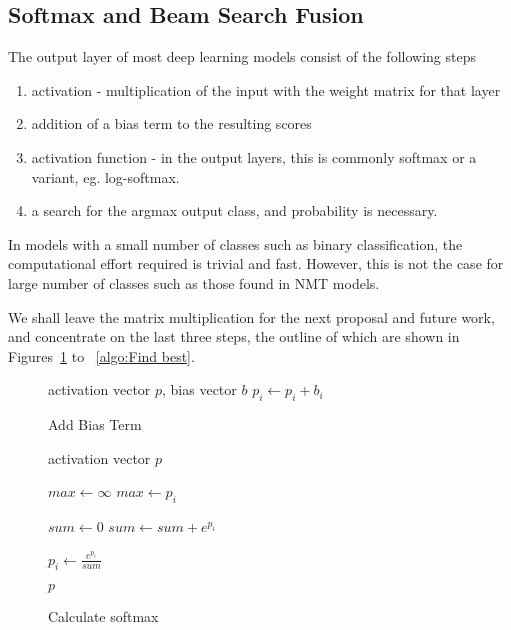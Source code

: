 \documentclass[]{article}
\begin{document}
\subsection{Softmax and Beam Search Fusion}

The output layer of most deep learning models consist of the following steps
\begin{enumerate}
   \item \vspace{-2 mm} activation - multiplication of the input with the weight matrix for that layer
   \item \vspace{-2 mm} addition of a bias term to the resulting scores
   \item \vspace{-2 mm} activation function - in the output layers, this is commonly softmax or a variant, eg. log-softmax.
   \item \vspace{-2 mm} a search for the argmax output class, and probability is necessary.
\end{enumerate}

In models with a small number of classes such as binary classification, the computational effort required is trivial and fast. However, this is not the case for large number of classes such as those found in NMT models.

We shall leave the matrix multiplication for the next proposal and future work, and concentrate on the last three steps, the outline of which are shown in Figures~\ref{algo:Add Bias Term} to ~\ref{algo:Find best}.

\begin{figure} [h]
\begin{algorithmic}
\REQUIRE activation vector $p$, bias vector $b$
  \STATE $p_i \gets p_i + b_i$
\ENDFOR 
\end{algorithmic}
\caption{Add Bias Term}
\label{algo:Add Bias Term}
\end{figure}

\begin{figure} [h]
\begin{algorithmic}
\REQUIRE activation vector $p$


\STATE $max \gets \infty$ 
    \STATE $max \gets p_i$
  \ENDIF
\ENDFOR 


\STATE $sum \gets 0$ 
  \STATE $sum \gets sum + e^{p_i}$
\ENDFOR 


  \STATE $p_i \gets \frac{e^{p_i}}{sum} $
\ENDFOR 

\RETURN $p$

\end{algorithmic}
\caption{Calculate softmax}
\label{algo:Calculate softmax}
\end{figure}
\end{document}
